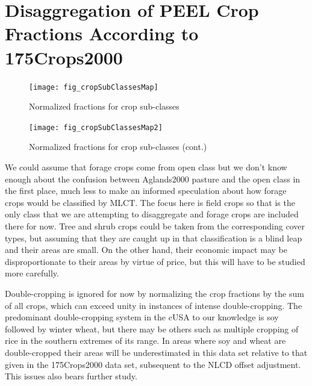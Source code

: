 \section{Disaggregation of PEEL Crop Fractions According to 175Crops2000}
\label{sec:peel}





\begin{figure}[hpt] 
  \centering

    \texttt{[image: fig\_cropSubClassesMap]}
  \caption{Normalized fractions for crop sub-classes}
  \label{fig:cropSubClassesMap} 
\end{figure} 

\begin{figure}[hpt] 
  \centering

    \texttt{[image: fig\_cropSubClassesMap2]}
  \caption{Normalized fractions for crop sub-classes (cont.)}
  \label{fig:cropSubClassesMap2} 
\end{figure} 


We could assume that forage crops come from open class but we don't
know enough about the confusion between Aglands2000 pasture and the
open class in the first place, much less to make an informed
speculation about how forage crops would be classified by MLCT.  The
focus here is field crops so that is the only class that we are
attempting to disaggregate and forage crops are included there for
now.  Tree and shrub crops could be taken from the corresponding cover
types, but assuming that they are caught up in that classification is
a blind leap and their areas are small.  On the other hand, their
economic impact may be disproportionate to their areas by virtue of
price, but this will have to be studied more carefully.

Double-cropping is ignored for now by normalizing the crop fractions
by the sum of all crops, which can exceed unity in instances of
intense double-cropping.  The predominant double-cropping system in
the cUSA to our knowledge is soy followed by winter wheat, but there
may be others such as multiple cropping of rice in the southern
extremes of its range.  In areas where soy and wheat are
double-cropped their areas will be underestimated in this data set
relative to that given in the 175Crops2000 data set, subsequent to the
NLCD offset adjustment.  This issues also bears further study.





